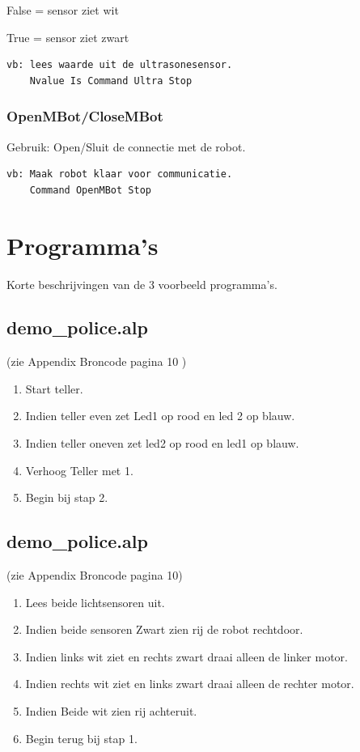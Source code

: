 \documentclass[a4paper,10pt]{article}
\begin{document}
      False = sensor ziet wit
      
      True  = sensor ziet zwart
      
      \begin{lstlisting}[language=Alphi]
vb: lees waarde uit de ultrasonesensor.
    Nvalue Is Command Ultra Stop
      \end{lstlisting}
    \subsubsection{OpenMBot/CloseMBot}
      Gebruik: Open/Sluit de connectie met de robot.
      \begin{lstlisting}[language=Alphi]
vb: Maak robot klaar voor communicatie.
    Command OpenMBot Stop
      \end{lstlisting}
     
    
\section{Programma's}
Korte beschrijvingen van de 3 voorbeeld programma's.
  \subsection{demo\_police.alp}
 (zie Appendix Broncode pagina 10 )
 \begin{enumerate}
   \item Start teller.
   \item Indien teller even zet Led1 op rood en led 2 op blauw.
   \item Indien teller oneven zet led2 op rood en led1 op blauw.
   \item Verhoog Teller met 1.
   \item Begin bij stap 2.
   \end{enumerate}
  \subsection{demo\_police.alp}
  (zie Appendix Broncode pagina 10)
  \begin{enumerate}
   \item Lees beide lichtsensoren uit.
   \item Indien beide sensoren Zwart zien rij de robot rechtdoor.
   \item Indien links wit ziet en rechts zwart draai alleen de linker motor.
   \item Indien rechts wit ziet en links zwart draai alleen de rechter motor.
   \item Indien Beide wit zien rij achteruit.
   \item Begin terug bij stap 1.
  \end{enumerate}
  
\end{document}
